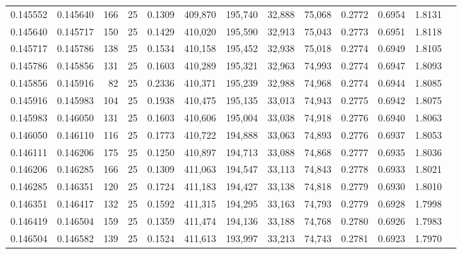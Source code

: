 \begin{tabular}{rrrrrrrrrrrrr}
0.145552 & 0.145640 &   166 &  25 &                                     0.1309 & 409,870 & 195,740 &  32,888 &  75,068 & 0.2772 & 0.6954 & 1.8131 \\
0.145640 & 0.145717 &   150 &  25 &                                     0.1429 & 410,020 & 195,590 &  32,913 &  75,043 & 0.2773 & 0.6951 & 1.8118 \\
0.145717 & 0.145786 &   138 &  25 &                                     0.1534 & 410,158 & 195,452 &  32,938 &  75,018 & 0.2774 & 0.6949 & 1.8105 \\
0.145786 & 0.145856 &   131 &  25 &                                     0.1603 & 410,289 & 195,321 &  32,963 &  74,993 & 0.2774 & 0.6947 & 1.8093 \\
0.145856 & 0.145916 &    82 &  25 &                                     0.2336 & 410,371 & 195,239 &  32,988 &  74,968 & 0.2774 & 0.6944 & 1.8085 \\
0.145916 & 0.145983 &   104 &  25 &                                     0.1938 & 410,475 & 195,135 &  33,013 &  74,943 & 0.2775 & 0.6942 & 1.8075 \\
0.145983 & 0.146050 &   131 &  25 &                                     0.1603 & 410,606 & 195,004 &  33,038 &  74,918 & 0.2776 & 0.6940 & 1.8063 \\
0.146050 & 0.146110 &   116 &  25 &                                     0.1773 & 410,722 & 194,888 &  33,063 &  74,893 & 0.2776 & 0.6937 & 1.8053 \\
0.146111 & 0.146206 &   175 &  25 &                                     0.1250 & 410,897 & 194,713 &  33,088 &  74,868 & 0.2777 & 0.6935 & 1.8036 \\
0.146206 & 0.146285 &   166 &  25 &                                     0.1309 & 411,063 & 194,547 &  33,113 &  74,843 & 0.2778 & 0.6933 & 1.8021 \\
0.146285 & 0.146351 &   120 &  25 &                                     0.1724 & 411,183 & 194,427 &  33,138 &  74,818 & 0.2779 & 0.6930 & 1.8010 \\
0.146351 & 0.146417 &   132 &  25 &                                     0.1592 & 411,315 & 194,295 &  33,163 &  74,793 & 0.2779 & 0.6928 & 1.7998 \\
0.146419 & 0.146504 &   159 &  25 &                                     0.1359 & 411,474 & 194,136 &  33,188 &  74,768 & 0.2780 & 0.6926 & 1.7983 \\
0.146504 & 0.146582 &   139 &  25 &                                     0.1524 & 411,613 & 193,997 &  33,213 &  74,743 & 0.2781 & 0.6923 & 1.7970 \\

\end{tabular}
